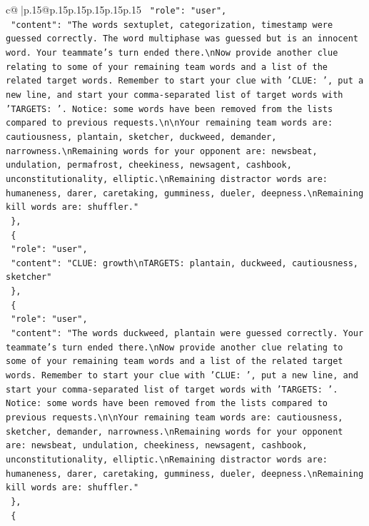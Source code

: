 \documentclass{article}
\begin{document}
{\begin{supertabular}{c@{$\;$}|p{.15\linewidth}@{}p{.15\linewidth}p{.15\linewidth}p{.15\linewidth}p{.15\linewidth}p{.15\linewidth}}
{{{\texttt{    "role": "user",} \\
\texttt{    "content": "The words sextuplet, categorization, timestamp were guessed correctly. The word multiphase was guessed but is an innocent word. Your teammate's turn ended there.\textbackslash{}nNow provide another clue relating to some of your remaining team words and a list of the related target words. Remember to start your clue with 'CLUE: ', put a new line, and start your comma{-}separated list of target words with 'TARGETS: '. Notice: some words have been removed from the lists compared to previous requests.\textbackslash{}n\textbackslash{}nYour remaining team words are: cautiousness, plantain, sketcher, duckweed, demander, narrowness.\textbackslash{}nRemaining words for your opponent are: newsbeat, undulation, permafrost, cheekiness, newsagent, cashbook, unconstitutionality, elliptic.\textbackslash{}nRemaining distractor words are: humaneness, darer, caretaking, gumminess, dueler, deepness.\textbackslash{}nRemaining kill words are: shuffler."} \\
\texttt{  \},} \\
\texttt{  \{} \\
\texttt{    "role": "user",} \\
\texttt{    "content": "CLUE: growth\textbackslash{}nTARGETS: plantain, duckweed, cautiousness, sketcher"} \\
\texttt{  \},} \\
\texttt{  \{} \\
\texttt{    "role": "user",} \\
\texttt{    "content": "The words duckweed, plantain were guessed correctly. Your teammate's turn ended there.\textbackslash{}nNow provide another clue relating to some of your remaining team words and a list of the related target words. Remember to start your clue with 'CLUE: ', put a new line, and start your comma{-}separated list of target words with 'TARGETS: '. Notice: some words have been removed from the lists compared to previous requests.\textbackslash{}n\textbackslash{}nYour remaining team words are: cautiousness, sketcher, demander, narrowness.\textbackslash{}nRemaining words for your opponent are: newsbeat, undulation, cheekiness, newsagent, cashbook, unconstitutionality, elliptic.\textbackslash{}nRemaining distractor words are: humaneness, darer, caretaking, gumminess, dueler, deepness.\textbackslash{}nRemaining kill words are: shuffler."} \\
\texttt{  \},} \\
\texttt{  \{} \\
}}}
\end{supertabular}}
\end{document}
